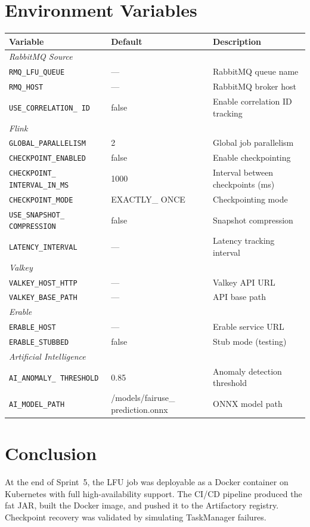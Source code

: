 \section{Environment Variables}

\begin{center}
    \begin{tabularx}{\textwidth}{|p{4.2cm}|p{3.5cm}|X|}
\toprule
\textbf{Variable} & \textbf{Default} & \textbf{Description} \\
\midrule
\multicolumn{3}{|l|}{\textit{RabbitMQ Source}} \\
\hline
\texttt{RMQ\_LFU\_QUEUE} & --- & RabbitMQ queue name \\
\texttt{RMQ\_HOST} & --- & RabbitMQ broker host \\
\texttt{USE\_CORRELATION\_ ID} & false & Enable correlation ID tracking \\
\midrule
\multicolumn{3}{|l|}{\textit{Flink}} \\
\hline
\texttt{GLOBAL\_PARALLELISM} & 2 & Global job parallelism \\
\texttt{CHECKPOINT\_ENABLED} & false & Enable checkpointing \\
\texttt{CHECKPOINT\_ INTERVAL\_IN\_MS} & 1000 & Interval between checkpoints (ms) \\
\texttt{CHECKPOINT\_MODE} & EXACTLY\_ ONCE & Checkpointing mode \\
\texttt{USE\_SNAPSHOT\_ COMPRESSION} & false & Snapshot compression \\
\texttt{LATENCY\_INTERVAL} & --- & Latency tracking interval \\
\midrule
\multicolumn{3}{|l|}{\textit{Valkey}} \\
\hline
\texttt{VALKEY\_HOST\_HTTP} & --- & Valkey API URL \\
\texttt{VALKEY\_BASE\_PATH} & --- & API base path \\
\midrule
\multicolumn{3}{|l|}{\textit{Erable}} \\
\hline
\texttt{ERABLE\_HOST} & --- & Erable service URL \\
\texttt{ERABLE\_STUBBED} & false & Stub mode (testing) \\
\midrule
\multicolumn{3}{|l|}{\textit{Artificial Intelligence}} \\
\hline
\texttt{AI\_ANOMALY\_ THRESHOLD} & 0.85 & Anomaly detection threshold \\
\texttt{AI\_MODEL\_PATH} & /models/fairuse\_ prediction.onnx & ONNX model path \\
\bottomrule
    \end{tabularx}
    \label{tab:env-vars}
\end{center}


\section*{Conclusion}

At the end of Sprint~5, the LFU job was deployable as a Docker container on Kubernetes with full high-availability support. The CI/CD pipeline produced the fat JAR, built the Docker image, and pushed it to the Artifactory registry. Checkpoint recovery was validated by simulating TaskManager failures.


